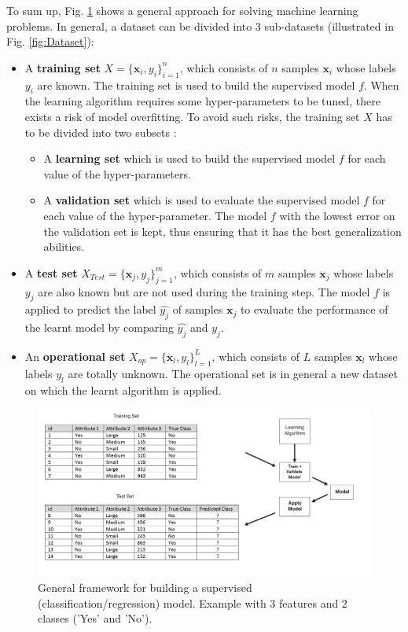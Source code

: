 \noindent To sum up, Fig. \ref{fig:LearningFramework} shows a general approach for solving machine learning problems. In general, a dataset can be divided into 3 sub-datasets (illustrated in Fig. \ref{fig:Dataset}):
\begin{itemize}
	\item A \textbf{training set} $X=\{\textbf{x}_i,y_i\}_{i=1}^n$, which consists of $n$ samples $\textbf{x}_i$ whose labels $y_i$ are known. The training set is used to build the supervised model $f$. When the learning algorithm requires some hyper-parameters to be tuned, there exists a risk of model overfitting. To avoid such risks, the training set $X$ has to be divided into two subsets :
	\begin{itemize}
		\item A \textbf{learning set} which is used to build the supervised model $f$ for each value of the hyper-parameters.
		\item A \textbf{validation set} which is used to evaluate the supervised model $f$ for each value of the hyper-parameter. The model $f$ with the lowest error on the validation set is kept, thus ensuring that it has the best generalization abilities.
	\end{itemize}
	\item A \textbf{test set} $X_{Test}=\{\textbf{x}_j,y_j\}_{j=1}^m$, which consists of $m$ samples $\textbf{x}_j$ whose labels $y_j$ are also known but are not used during the training step. The model $f$ is applied to predict the label $\hat{y_j}$ of samples $\textbf{x}_j$ to evaluate the performance of the learnt model by comparing $\hat{y_j}$ and $y_j$. 
	\item An \textbf{operational set} $X_{op}=\{\textbf{x}_l,y_l\}_{l=1}^L$, which consists of $L$ samples $\textbf{x}_l$ whose labels $y_l$ are totally unknown. The operational set is in general a new dataset on which the learnt algorithm is applied. 
\end{itemize}


\begin{figure}[h!]
	\centering
	\includegraphics[width=1\linewidth]{images/LearningFramework}
	\caption{General framework for building a supervised (classification/regression) model. Example with 3 features and 2 classes ('Yes' and 'No').}
	\label{fig:LearningFramework}
\end{figure}

